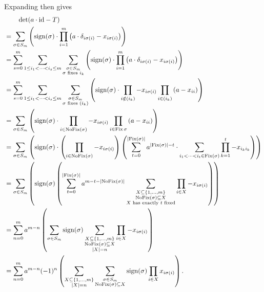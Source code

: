 \begin{problem}
\begin{sol}
		Expanding then gives
		\begin{align*}
			&\qquad \det (a \cdot \mathrm{id} - T) \\
			&= \sum_{\sigma \in S_m} \left( \operatorname{sign}(\sigma)
			\cdot \prod_{i=1}^m \left( a \cdot \delta_{i \sigma(i)} - x_{i \sigma(i)} \right)\right) \\
			&=
			\sum_{s=0}^m
			\sum_{1 \le i_1 < \dots < i_s \le m}
			\sum_{\substack{\sigma \in S_m \\ \sigma \text{ fixes } i_k}}
			\left( \operatorname{sign}(\sigma)
			\cdot \prod_{i=1}^m \left( a \cdot \delta_{i \sigma(i)} - x_{i \sigma(i)} \right)\right) \\
			&=
			\sum_{s=0}^m
			\sum_{1 \le i_1 < \dots < i_s \le m}
			\sum_{\substack{\sigma \in S_m \\ \sigma \text{ fixes } (i_k)}}
			\left( \operatorname{sign}(\sigma)
			\cdot \prod_{i \notin (i_k)} -x_{i \sigma(i)}
			\prod_{i \in (i_k)} \left( a - x_{ii}
			\right)\right) \\
			&=
			\sum_{\sigma \in S_m}
			\left( \operatorname{sign}(\sigma)
			\cdot \prod_{i \in \operatorname{NoFix}(\sigma)} -x_{i \sigma(i)}
			\prod_{i \in \operatorname{Fix}{\sigma}} \left( a - x_{ii}
			\right)\right) \\
			&=
			\sum_{\sigma \in S_m}
			\left( \operatorname{sign}(\sigma)
			\cdot \left( \prod_{i \in \operatorname{NoFix}(\sigma)} -x_{i \sigma(i)} \right)
			\left( \sum_{t=0}^{\left\lvert \operatorname{Fix}(\sigma) \right\rvert}
			a^{\left\lvert \operatorname{Fix}(\sigma) \right\rvert - t} \cdot \sum_{i_1 < \dots < i_t \in \operatorname{Fix}(\sigma)}
			\prod_{k=1}^t -x_{i_k i_k} \right)
			\right) \\
			&=
			\sum_{\sigma \in S_m}
			\left( \operatorname{sign}(\sigma)
			\left( \sum_{t=0}^{\left\lvert \operatorname{Fix}(\sigma) \right\rvert}
			a^{m-t-\left\lvert \operatorname{NoFix}(\sigma) \right\rvert}
			\sum_{\substack{X \subseteq \{1, \dots, m\} \\ \operatorname{NoFix}(\sigma) \subseteq X \\ X \text{ has exactly $t$ fixed}}} \prod_{i \in X} -x_{i \sigma(i)}
			\right) \right) \\
			&=
			\sum_{n=0}^m
			a^{m-n}
			\left(
			\sum_{\sigma \in S_m}
			\operatorname{sign}(\sigma)
			\sum_{\substack{X \subseteq \{1, \dots, m\} \\ \operatorname{NoFix}(\sigma) \subseteq X \\ \left\lvert X \right\rvert = n} }
			\prod_{i \in X} -x_{i \sigma(i)}
			\right) \\
			&= \sum_{n=0}^m
			a^{m-n} (-1)^n
			\left(
			\sum_{\substack{X \subseteq \{1, \dots, m\} \\ \left\lvert X \right\rvert = n} }
			\sum_{\substack{\sigma \in S_m \\ \operatorname{NoFix}(\sigma) \subseteq X}}
			\operatorname{sign}(\sigma) \prod_{i \in X} x_{i \sigma(i)}
			\right).
		\end{align*}


\end{sol}
\end{problem}
